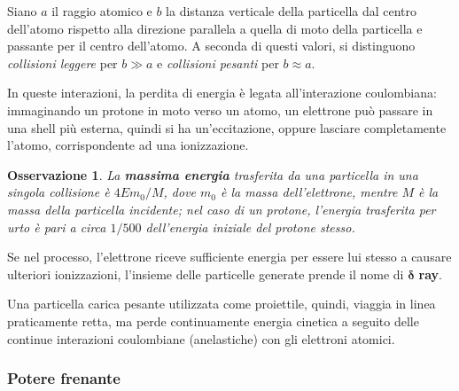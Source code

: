 \documentclass[11pt, a4paper]{scrartcl}
\theoremstyle{style}
\newtheorem{osservazione}{Osservazione}[section]
\theoremstyle{style1}
\numberwithin{equation}{subsection}
\begin{document}
\begin{center}
	\begin{minipage}
		{.45\columnwidth}
	Siano $a$ il raggio atomico e $b$ la distanza verticale della particella dal centro dell'atomo rispetto alla direzione parallela a quella di moto della particella e passante per il centro dell'atomo.
	A seconda di questi valori, si distinguono \textit{collisioni leggere} per $b\gg a$ e \textit{collisioni pesanti} per $b\approx a$.
	\end{minipage}
	\hfill
	\begin{minipage}
		{.45\columnwidth}
	\centering
	\end{minipage}
\end{center}
In queste interazioni, la perdita di energia \`e legata all'interazione coulombiana: immaginando un protone in moto verso un atomo, un elettrone pu\`o passare in una shell pi\`u esterna, quindi si ha un'eccitazione, oppure lasciare completamente l'atomo, corrispondente ad una ionizzazione.
\begin{osservazione}
La \textbf{massima energia} trasferita da una particella in una singola collisione \`e $4Em_0 / M$, dove $m_0$ \`e la massa dell'elettrone, mentre $M$ \`e la massa della particella incidente; nel caso di un protone, l'energia trasferita per urto \`e pari a circa $1 / 500$ dell'energia iniziale del protone stesso.
\end{osservazione}

\noindent Se nel processo, l'elettrone riceve sufficiente energia per essere lui stesso a causare ulteriori ionizzazioni, l'insieme delle particelle generate prende il nome di $\pmb{\delta }$ \textbf{ray}.

Una particella carica pesante utilizzata come proiettile, quindi, viaggia in linea praticamente retta, ma perde continuamente energia cinetica a seguito delle continue interazioni coulombiane (anelastiche) con gli elettroni atomici.

\subsubsection{Potere frenante}
\end{document}
